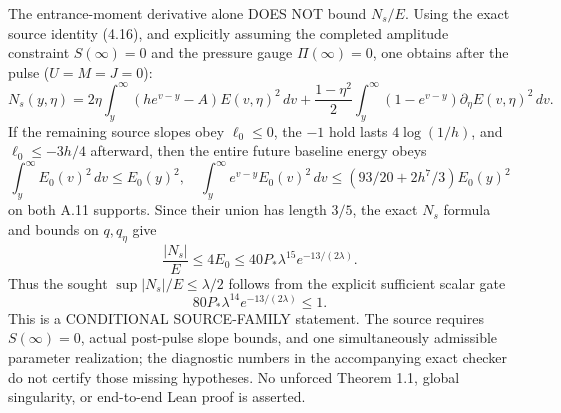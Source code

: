 The entrance-moment derivative alone DOES NOT bound \(N_s/E\).
Using the exact source identity (4.16), and explicitly assuming
the completed amplitude constraint \(S(\infty)=0\) and
the pressure gauge \(\Pi(\infty)=0\), one obtains after the
pulse (\(U=M=J=0\)):
\[
N_s(y,\eta)=2\eta\int_y^\infty
(h e^{v-y}-A)E(v,\eta)^2\,dv
+\frac{1-\eta^2}{2}\int_y^\infty
(1-e^{v-y})\partial_\eta E(v,\eta)^2\,dv .
\]
If the remaining source slopes obey \(\ell_0\le0\),
the \(-1\) hold lasts \(4\log(1/h)\), and
\(\ell_0\le-3h/4\) afterward, then the entire future
baseline energy obeys
\[
\int_y^\infty E_0(v)^2\,dv\le E_0(y)^2,\quad
\int_y^\infty e^{v-y}E_0(v)^2\,dv
\le(93/20+2h^7/3)E_0(y)^2
\]
on both A.11 supports. Since their union has length \(3/5\),
the exact \(N_s\) formula and bounds on \(q,q_\eta\) give
\[
\frac{|N_s|}{E}\le4E_0
\le40P_*\lambda^{15}e^{-13/(2\lambda)}.
\]
Thus the sought \(\sup|N_s|/E\le\lambda/2\) follows from
the explicit sufficient scalar gate
\[
80P_*\lambda^{14}e^{-13/(2\lambda)}\le1.
\]
This is a CONDITIONAL SOURCE-FAMILY statement. The source
requires \(S(\infty)=0\), actual post-pulse slope bounds, and
one simultaneously admissible parameter realization; the
diagnostic numbers in the accompanying exact checker do not
certify those missing hypotheses. No unforced Theorem 1.1,
global singularity, or end-to-end Lean proof is asserted.
